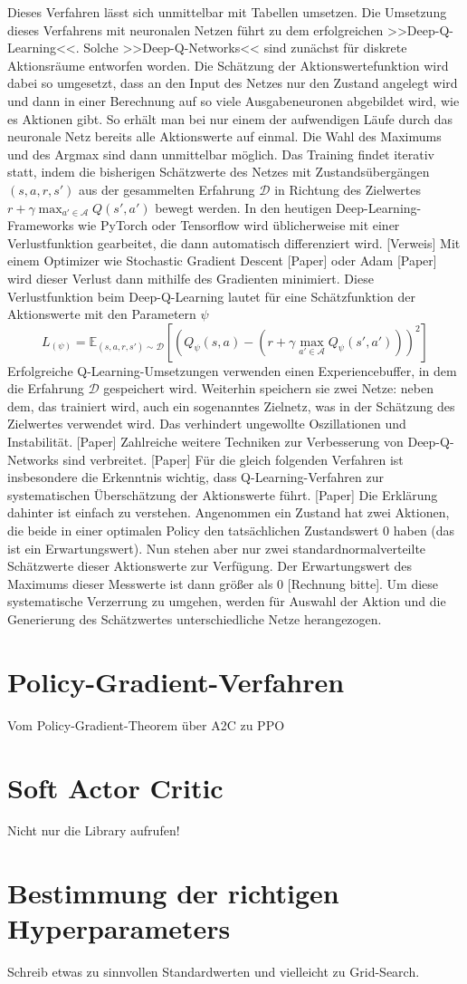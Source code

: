 Dieses Verfahren lässt sich unmittelbar mit Tabellen umsetzen.
Die Umsetzung dieses Verfahrens mit neuronalen Netzen führt zu dem erfolgreichen >>Deep-Q-Learning<<.
Solche >>Deep-Q-Networks<< sind zunächst für diskrete Aktionsräume entworfen worden.
Die Schätzung der Aktionswertefunktion wird dabei so umgesetzt, dass an den Input des Netzes nur den Zustand angelegt wird und dann in einer Berechnung auf so viele Ausgabeneuronen abgebildet wird, wie es Aktionen gibt.
So erhält man bei nur einem der aufwendigen Läufe durch das neuronale Netz bereits alle Aktionswerte auf einmal.
Die Wahl des Maximums und des Argmax sind dann unmittelbar möglich.
Das Training findet iterativ statt, indem die bisherigen Schätzwerte des Netzes mit Zustandsübergängen $(s, a, r, s')$ aus der gesammelten Erfahrung $\mathcal{D}$ in Richtung des Zielwertes $r+\gamma \max_{a'\in\mathcal{A}}{Q(s',a')}$ bewegt werden.
In den heutigen Deep-Learning-Frameworks wie PyTorch oder Tensorflow wird üblicherweise mit einer Verlustfunktion gearbeitet, die dann automatisch differenziert wird. [Verweis]
Mit einem Optimizer wie Stochastic Gradient Descent [Paper] oder Adam [Paper] wird dieser Verlust dann mithilfe des Gradienten minimiert.
Diese Verlustfunktion beim Deep-Q-Learning lautet für eine Schätzfunktion der Aktionswerte mit den Parametern $\psi$
\begin{equation}
    L_(\psi) = \mathbb{E}_{(s, a, r, s')\sim\mathcal{D}}\left[\left(Q_\psi(s,a)-\left(r+\gamma \max_{a'\in\mathcal{A}}{Q_\psi(s',a')}\right)\right)^2\right]
\end{equation}
Erfolgreiche Q-Learning-Umsetzungen verwenden einen Experiencebuffer, in dem die Erfahrung $\mathcal{D}$ gespeichert wird.
Weiterhin speichern sie zwei Netze: neben dem, das trainiert wird, auch ein sogenanntes Zielnetz, was in der Schätzung des Zielwertes verwendet wird.
Das verhindert ungewollte Oszillationen und Instabilität. [Paper]
Zahlreiche weitere Techniken zur Verbesserung von Deep-Q-Networks sind verbreitet. [Paper]
Für die gleich folgenden Verfahren ist insbesondere die Erkenntnis wichtig, dass Q-Learning-Verfahren zur systematischen Überschätzung der Aktionswerte führt. [Paper]
Die Erklärung dahinter ist einfach zu verstehen.
Angenommen ein Zustand hat zwei Aktionen, die beide in einer optimalen Policy den tatsächlichen Zustandswert 0 haben (das ist ein Erwartungswert).
Nun stehen aber nur zwei standardnormalverteilte Schätzwerte dieser Aktionswerte zur Verfügung.
Der Erwartungswert des Maximums dieser Messwerte ist dann größer als 0 [Rechnung bitte].
Um diese systematische Verzerrung zu umgehen, werden für Auswahl der Aktion und die Generierung des Schätzwertes unterschiedliche Netze herangezogen.

\section{Policy-Gradient-Verfahren}
Vom Policy-Gradient-Theorem über A2C zu PPO

\section{Soft Actor Critic}
Nicht nur die Library aufrufen!

\section{Bestimmung der richtigen Hyperparameters}
Schreib etwas zu sinnvollen Standardwerten und vielleicht zu Grid-Search.
